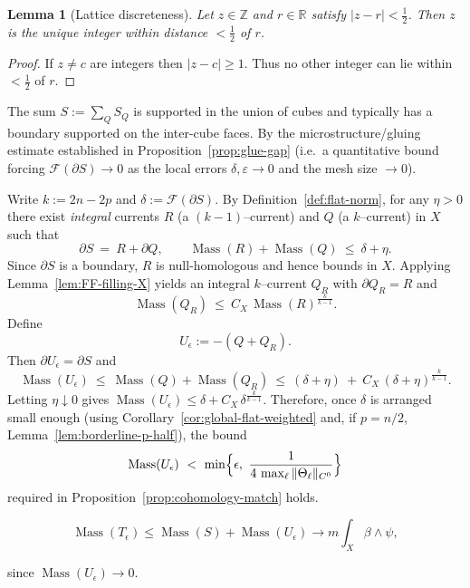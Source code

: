 \documentclass[11pt]{article}
\numberwithin{equation}{section}  %
\theoremstyle{plain}
\newtheorem{lemma}[theorem]{Lemma}
\theoremstyle{definition}
\theoremstyle{remark}
\newcommand{\R}{\mathbb{R}}
\newcommand{\Z}{\mathbb{Z}}
\DeclareMathOperator{\Mass}{Mass}
\begin{document}
\begin{lemma}[Lattice discreteness]\label{lem:lattice-discreteness}
Let $z\in\Z$ and $r\in\R$ satisfy $|z-r|<\tfrac12$.  Then $z$ is the unique integer within distance $<\tfrac12$ of $r$.
\end{lemma}
\begin{proof}
If $z\neq c$ are integers then $|z-c|\ge 1$.  Thus no other integer can lie within $<\tfrac12$ of $r$.
\end{proof}



The sum $S:=\sum_Q S_Q$ is supported in the union of cubes and typically
has a boundary supported on the inter-cube faces.
By the microstructure/gluing estimate established in Proposition~\ref{prop:glue-gap}
(i.e.\ a quantitative bound forcing $\mathcal F(\partial S)\to 0$ as the local errors $\delta,\varepsilon\to 0$ and the mesh size $\to 0$).


Write $k:=2n-2p$ and $\delta:=\mathcal F(\partial S)$.
By Definition~\ref{def:flat-norm}, for any $\eta>0$ there exist \emph{integral} currents
$R$ (a $(k-1)$--current) and $Q$ (a $k$--current) in $X$ such that
\[
\partial S\ =\ R+\partial Q,
\qquad
\Mass(R)+\Mass(Q)\ \le\ \delta+\eta.
\]
Since $\partial S$ is a boundary, $R$ is null-homologous and hence bounds in $X$.
Applying Lemma~\ref{lem:FF-filling-X} yields an integral $k$--current $Q_R$ with $\partial Q_R=R$ and
\[
\Mass(Q_R)\ \le\ C_X\,\Mass(R)^{\frac{k}{k-1}}.
\]
Define
\[
U_\epsilon:=-(Q+Q_R).
\]
Then $\partial U_\epsilon=\partial S$ and
\[
\Mass(U_\epsilon)\ \le\ \Mass(Q)+\Mass(Q_R)
\ \le\ (\delta+\eta)\ +\ C_X\,(\delta+\eta)^{\frac{k}{k-1}}.
\]
Letting $\eta\downarrow 0$ gives $\Mass(U_\epsilon)\le \delta + C_X\,\delta^{\frac{k}{k-1}}$.
Therefore, once $\delta$ is arranged small enough (using Corollary~\ref{cor:global-flat-weighted} and, if $p=n/2$,
Lemma~\ref{lem:borderline-p-half}), the bound
\[
\Mass(U_\epsilon)\ <\ \min\Bigl\{\epsilon,\ \frac{1}{4\,\max_\ell\|\Theta_\ell\|_{C^0}}\Bigr\}
\]
required in Proposition~\ref{prop:cohomology-match} holds.



\[
\Mass(T_\epsilon)
\le \Mass(S) + \Mass(U_\epsilon)
\to m\int_X \beta\wedge \psi,
\]

since $\Mass(U_\epsilon)\to 0$.
\end{document}
